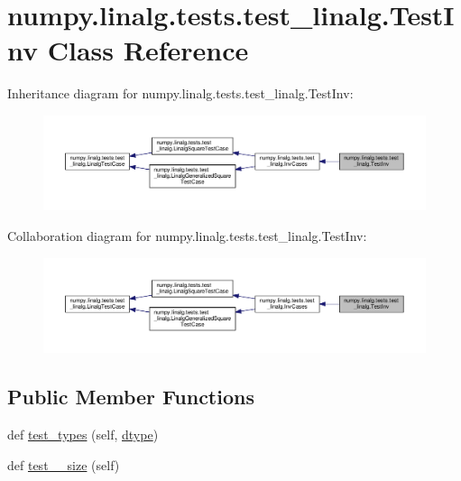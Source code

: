 \hypertarget{classnumpy_1_1linalg_1_1tests_1_1test__linalg_1_1TestInv}{}\section{numpy.\+linalg.\+tests.\+test\+\_\+linalg.\+Test\+Inv Class Reference}
\label{classnumpy_1_1linalg_1_1tests_1_1test__linalg_1_1TestInv}


Inheritance diagram for numpy.\+linalg.\+tests.\+test\+\_\+linalg.\+Test\+Inv\+:
\nopagebreak
\begin{figure}[H]
\begin{center}
\leavevmode
\includegraphics[width=350pt]{classnumpy_1_1linalg_1_1tests_1_1test__linalg_1_1TestInv__inherit__graph}
\end{center}
\end{figure}


Collaboration diagram for numpy.\+linalg.\+tests.\+test\+\_\+linalg.\+Test\+Inv\+:
\nopagebreak
\begin{figure}[H]
\begin{center}
\leavevmode
\includegraphics[width=350pt]{classnumpy_1_1linalg_1_1tests_1_1test__linalg_1_1TestInv__coll__graph}
\end{center}
\end{figure}
\subsection*{Public Member Functions}
\begin{DoxyCompactItemize}
\item 
def \hyperlink{classnumpy_1_1linalg_1_1tests_1_1test__linalg_1_1TestInv_ab67eca839abbfafe278eb5738a0886ef}{test\+\_\+types} (self, \hyperlink{namespacenumpy_1_1linalg_1_1tests_1_1test__linalg_a1063ea74fa35b7244592f8a89b8a71a2}{dtype})
\item 
def \hyperlink{classnumpy_1_1linalg_1_1tests_1_1test__linalg_1_1TestInv_a7c169b5707cb83ed696d82d6105d99a0}{test\+\_\+\_\+size} (self)
\end{DoxyCompactItemize}
